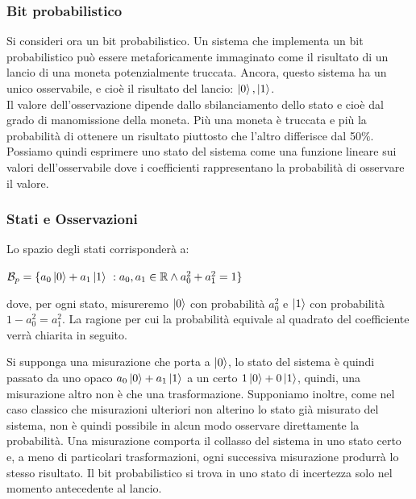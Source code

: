 \documentclass[12pt,a4paper,openright]{report}
\begin{document}
\subsubsection{Bit probabilistico}
Si consideri ora un bit probabilistico. Un sistema che implementa un bit probabilistico può essere metaforicamente immaginato come il risultato di un lancio
di una moneta potenzialmente truccata. Ancora, questo sistema ha un unico osservabile, e cioè il risultato del lancio: $\ket{0},\ket1$.\\
Il valore dell'osservazione dipende dallo sbilanciamento dello stato e cioè dal grado di manomissione della moneta. Più una moneta è truccata e più la probabilità
di ottenere un risultato piuttosto che l'altro differisce dal 50$\%$. Possiamo quindi esprimere uno stato del sistema come una funzione lineare sui valori dell'osservabile
dove i coefficienti rappresentano la probabilità di osservare il valore. \newpage
\subsubsection{Stati e Osservazioni} 
Lo spazio degli stati corrisponderà a:

\begin{center}
    $ \mathcal{B}_p = \{a_0\ket0 + a_1\ket1 \ : a_0,a_1 \in{\mathbb{R}} \land a_0^2+a_1^2 = 1\}$
\end{center}

\noindent dove, per ogni stato, misureremo $\ket0$ con probabilità $a_0^2$ e $\ket1$ con probabilità $1 - a_0^2 = a_1^2$.
La ragione per cui la probabilità equivale al quadrato del coefficiente verrà chiarita in seguito.\par
Si supponga una misurazione che porta a $\ket0$, lo stato del sistema è quindi passato da uno opaco $a_0\ket0 + a_1\ket1$ a un certo $1\ket0+0\ket1$,
quindi, una misurazione altro non è che una trasformazione. Supponiamo inoltre, come nel caso classico che misurazioni ulteriori non alterino lo stato già
misurato del sistema, non è quindi possibile in alcun modo osservare direttamente la probabilità. Una misurazione comporta il collasso del sistema in uno 
stato certo e, a meno di particolari trasformazioni, ogni successiva misurazione produrrà lo stesso risultato. Il bit probabilistico si trova
in uno stato di incertezza solo nel momento antecedente al lancio.
\end{document}
